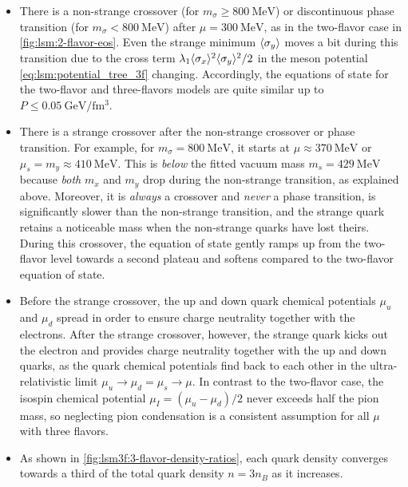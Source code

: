 \begin{itemize}
\item There is a non-strange crossover (for $m_\sigma \geq \SI{800}{\mega\electronvolt}$)
      or discontinuous phase transition (for $m_\sigma < \SI{800}{\mega\electronvolt}$)
      after $\mu=\SI{300}{\mega\electronvolt}$, as in the two-flavor case in \cref{fig:lsm:2-flavor-eos}.
      Even the strange minimum $\langle \sigma_y \rangle$ moves a bit during this transition
      due to the cross term $\lambda_1 \langle \sigma_x \rangle^2 \langle \sigma_y \rangle^2 / 2$ in the meson potential \eqref{eq:lsm:potential_tree_3f} changing.
      Accordingly, the equations of state for the two-flavor and three-flavors models are quite similar up to $P \leq \SI{0.05}{\giga\electronvolt\per\femto\meter\cubed}$.
\item There is a strange crossover after the non-strange crossover or phase transition.
      For example, for $m_\sigma=\SI{800}{\mega\electronvolt}$, it starts at $\mu \approx \SI{370}{\mega\electronvolt}$ 
      or $\mu_s = m_y \approx \SI{410}{\mega\electronvolt}$.
      This is \emph{below} the fitted vacuum mass $m_s=\SI{429}{\mega\electronvolt}$
      because \emph{both} $m_x$ and $m_y$ drop during the non-strange transition, as explained above.
      Moreover, it is \emph{always} a crossover and \emph{never} a phase transition,
      is significantly slower than the non-strange transition,
      and the strange quark retains a noticeable mass when the non-strange quarks have lost theirs.
      During this crossover, the equation of state gently ramps up from the two-flavor level towards a second plateau
      and softens compared to the two-flavor equation of state.
\item Before the strange crossover, the up and down quark chemical potentials $\mu_u$ and $\mu_d$
      spread in order to ensure charge neutrality together with the electrons.
      After the strange crossover, however, the strange quark kicks out the electron
      and provides charge neutrality together with the up and down quarks,
      as the quark chemical potentials find back to each other in the ultra-relativistic limit $\mu_u \rightarrow \mu_d = \mu_s \rightarrow \mu$.
      In contrast to the two-flavor case,
      the isospin chemical potential $\mu_I=(\mu_u-\mu_d)/2$ never exceeds half the pion mass,
      so neglecting pion condensation is a consistent assumption for all $\mu$ with three flavors.
\item As shown in \cref{fig:lsm3f:3-flavor-density-ratios},
      each quark density converges towards a third of the total quark density $n = 3 n_B$ as it increases.

\end{itemize}
